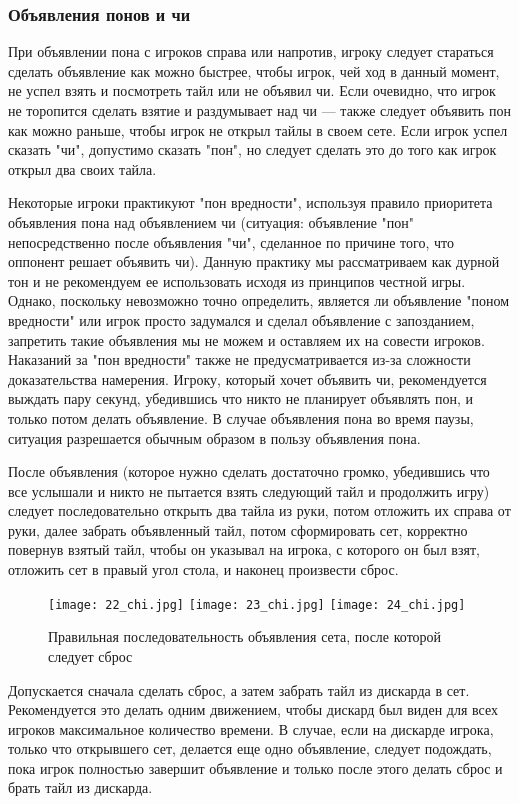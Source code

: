 \subsubsection{Объявления понов и чи}

При объявлении пона с игроков справа или напротив, игроку следует стараться сделать объявление как можно быстрее, чтобы игрок, чей ход в данный момент, не успел взять и посмотреть тайл или не объявил чи. Если очевидно, что игрок не торопится сделать взятие и раздумывает над чи --- также следует объявить пон как можно раньше, чтобы игрок не открыл тайлы в своем сете. Если игрок успел сказать "чи", допустимо сказать "пон", но следует сделать это до того как игрок открыл два своих тайла. 

Некоторые игроки практикуют "пон вредности", используя правило приоритета объявления пона над объявлением чи (ситуация: объявление "пон" непосредственно после объявления "чи", сделанное по причине того, что оппонент решает объявить чи). Данную практику мы рассматриваем как дурной тон и не рекомендуем ее использовать исходя из принципов честной игры. Однако, поскольку невозможно точно определить, является ли объявление "поном вредности" или игрок просто задумался и сделал объявление с запозданием, запретить такие объявления мы не можем и оставляем их на совести игроков. Наказаний за "пон вредности" также не предусматривается из-за сложности доказательства намерения. Игроку, который хочет объявить чи, рекомендуется выждать пару секунд, убедившись что никто не планирует объявлять пон, и только потом делать объявление. В случае объявления пона во время паузы, ситуация разрешается обычным образом в пользу объявления пона.

После объявления (которое нужно сделать достаточно громко, убедившись что все услышали и никто не пытается взять следующий тайл и продолжить игру) следует последовательно открыть два тайла из руки, потом отложить их справа от руки, далее забрать объявленный тайл, потом сформировать сет, корректно повернув взятый тайл, чтобы он указывал на игрока, с которого он был взят, отложить сет в правый угол стола, и наконец произвести сброс.

\begin{figure}[H]
	\centering
	\texttt{[image: 22\_chi.jpg]}
	\texttt{[image: 23\_chi.jpg]}
	\texttt{[image: 24\_chi.jpg]}
	\caption{Правильная последовательность объявления сета, после которой следует сброс}
\end{figure}

Допускается сначала сделать сброс, а затем забрать тайл из дискарда в сет. Рекомендуется это делать одним движением, чтобы дискард был виден для всех игроков максимальное количество времени. В случае, если на дискарде игрока, только что открывшего сет, делается еще одно объявление, следует подождать, пока игрок полностью завершит объявление и только после этого делать сброс и брать тайл из дискарда.

